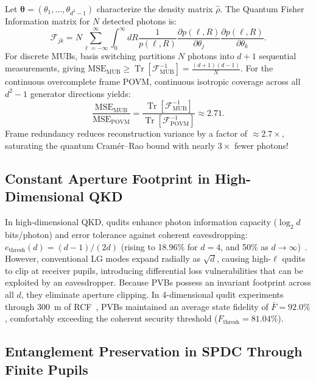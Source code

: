 \documentclass{optica-article}
\begin{document}
Let $\boldsymbol{\theta} = (\theta_1, \dots, \theta_{d^2-1})$ characterize the density matrix $\hat{\rho}$. The Quantum Fisher Information matrix for $N$ detected photons is:
\begin{equation}
\mathcal{F}_{jk} = N \sum_{\ell=-\infty}^\infty \int_0^\infty dR \frac{1}{p(\ell, R)} \frac{\partial p(\ell, R)}{\partial \theta_j} \frac{\partial p(\ell, R)}{\partial \theta_k}.
\label{eq:fisher_matrix_def}
\end{equation}
For discrete MUBs, basis switching partitions $N$ photons into $d+1$ sequential measurements, giving $\text{MSE}_{\text{MUB}} \ge \operatorname{Tr}[\mathcal{F}_{\text{MUB}}^{-1}] = \frac{(d+1)(d-1)}{N}$. For the continuous overcomplete frame POVM, continuous isotropic coverage across all $d^2-1$ generator directions yields:
\begin{equation}
\boxed{\frac{\text{MSE}_{\text{MUB}}}{\text{MSE}_{\text{POVM}}} = \frac{\operatorname{Tr}[\mathcal{F}_{\text{MUB}}^{-1}]}{\operatorname{Tr}[\mathcal{F}_{\text{POVM}}^{-1}]} \approx \mathbf{2.71}.}
\label{eq:cramer_rao_advantage}
\end{equation}
Frame redundancy reduces reconstruction variance by a factor of $\approx 2.7\times$, saturating the quantum Cramér--Rao bound with nearly $3\times$ fewer photons!

\subsection{Constant Aperture Footprint in High-Dimensional QKD}

In high-dimensional QKD, qudits enhance photon information capacity ($\log_2 d$ bits/photon) and error tolerance against coherent eavesdropping: $e_{\text{thresh}}(d) = (d-1)/(2d)$ (rising to 18.96\% for $d=4$, and 50\% as $d \to \infty$)~\cite{Cerf2002,Mirhosseini2015,BennettBrassard1984}. However, conventional LG modes expand radially as $\sqrt{d}$, causing high-$\ell$ qudits to clip at receiver pupils, introducing differential loss vulnerabilities that can be exploited by an eavesdropper. Because PVBs possess an invariant footprint across all $d$, they eliminate aperture clipping. In 4-dimensional qudit experiments through 300~m of RCF~\cite{Villalba2023}, PVBs maintained an average state fidelity of $\bar{F} = 92.0\%$, comfortably exceeding the coherent security threshold ($F_{\text{thresh}} = 81.04\%$).

\subsection{Entanglement Preservation in SPDC Through Finite Pupils}
\end{document}
